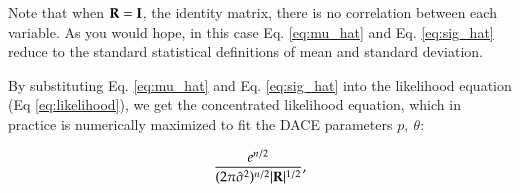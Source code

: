Note that when $\mathbf{R}=\mathbf{I}$, the identity matrix, there is no correlation between each variable. As you would hope, in this case Eq. \ref{eq:mu_hat} and Eq. \ref{eq:sig_hat} reduce to the standard statistical definitions of mean and standard deviation.

By substituting Eq. \ref{eq:mu_hat} and Eq. \ref{eq:sig_hat} into the likelihood equation (Eq \ref{eq:likelihood}), we get the concentrated likelihood equation, which in practice is numerically maximized to fit the DACE parameters $p,\ \theta$:

\begin{equation} \label{eq:conc_likelihood}
\frac{e^{n/2}}
  {(2\pi\hat{\sigma}^2)^{n/2}|\mathbf{R}|^{1/2}},
\end{equation}
